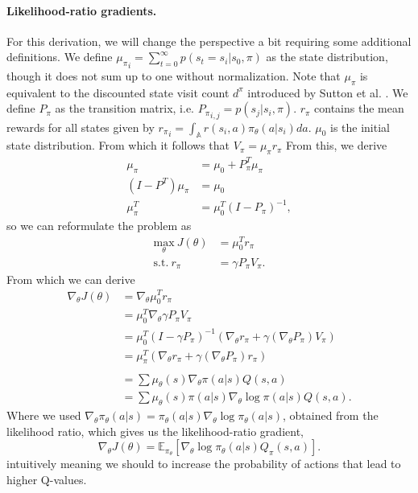 \paragraph{Likelihood-ratio gradients.} 
For this derivation, we will change the perspective a bit requiring some additional definitions. 
We define ${\mu_\pi}_i = \sum_{t=0}^{\infty} p(s_t=s_i | s_0, \pi)$ \cite{puterman2014markov} as the state distribution, though it does not sum up to one without normalization. Note that $\mu_\pi$ is equivalent to the discounted state visit count $d^\pi$ introduced by Sutton et al. \cite{Sutton:1999:PGM:3009657.3009806}.
We define $P_\pi$ as the transition matrix, i.e. ${P_\pi}_{i,j}=p(s_j|s_i,\pi)$.
$r_\pi$ contains the mean rewards for all states given by ${r_\pi}_i = \int_\mathbb{A} r(s_i,a)\pi_\theta(a|s_i) da$. 
$\mu_0$ is the initial state distribution.
From which it follows that $V_\pi = \mu_\pi r_\pi$
From this, we derive
\begin{align}
	\mu_\pi &= \mu_0 + P_\pi^T \mu_\pi \nonumber \\
	(I-P^T)\mu_\pi &= \mu_0 \nonumber \\
	\mu_\pi^T &= \mu_0^T (I-P_\pi)^{-1} ,
\end{align}
so we can reformulate the problem as 
\begin{align}
	\underset{\theta}{\text{max}}\ J(\theta) &= \mu_0^T r_\pi \\
	\text{s.t.}\ r_\pi &= \gamma P_\pi V_\pi . \nonumber
\end{align}
From which we can derive 
\begin{align*}
	\nabla_\theta J(\theta) &= \nabla_\theta \mu_0^T r_\pi
	\\ &= \mu_0^T \nabla_\theta \gamma P_\pi V_\pi
	\\ &= \mu_0^T (I - \gamma P_\pi)^{-1} (\nabla_\theta r_\pi + \gamma (\nabla_\theta P_\pi) V_\pi)
	\\ &= \mu_\pi^T (\nabla_\theta r_\pi + \gamma (\nabla_\theta P_\pi) r_\pi)
	\\ 
	\\ &= \sum \mu_\theta(s) \nabla_\theta\pi(a|s) Q(s,a)
	\\ &= \sum \mu_\theta(s) \pi(a|s) \nabla_\theta\log\pi(a|s) Q(s,a).
\end{align*}
Where we used $\nabla_\theta \pi_\theta(a|s) = \pi_\theta(a|s)\nabla_\theta\log\pi_\theta(a|s)$, obtained from the likelihood ratio, which gives us the likelihood-ratio gradient,
\begin{equation}
	\nabla_\theta J(\theta) = \mathbb{E}_{\pi_\theta}\left[\nabla_\theta{\log\pi_\theta(a|s)}Q_\pi(s,a)\right].
	\label{eqn:like-grad}
\end{equation}
intuitively meaning we should to increase the probability of actions that lead to higher Q-values.


